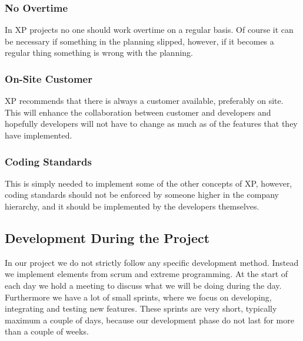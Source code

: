\subsubsection{No Overtime}
In XP projects no one should work overtime on a regular basis.
Of course it can be necessary if something in the planning slipped, however, if it becomes a regular thing something is wrong with the planning.

\subsubsection{On-Site Customer}
XP recommends that there is always a customer available, preferably on site.
This will enhance the collaboration between customer and developers and hopefully developers will not have to change as much as of the features that they have implemented.

\subsubsection{Coding Standards}
This is simply needed to implement some of the other concepts of XP, however, coding standards should not be enforced by someone higher in the company hierarchy, and it should be implemented by the developers themselves.


\subsection{Development During the Project}
\label{sub:ourDevMethod}
In our project we do not strictly follow any specific development method. Instead we implement elements from scrum and extreme programming. At the start of each day we hold a meeting to discuss what we will be doing during the day. Furthermore we have a lot of small sprints, where we focus on developing, integrating and testing new features. These sprints are very short, typically maximum a couple of days, because our development phase do not last for more than a couple of weeks.

